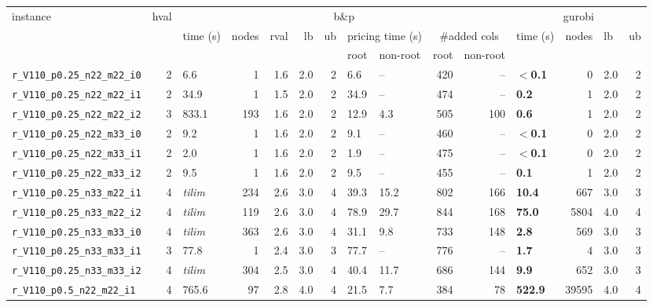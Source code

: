 \documentclass[preprint, 11pt, authoryear]{elsarticle}
\begin{document}
\begin{table}
\centering
\small
\setlength{\tabcolsep}{4pt}
\begin{tabular}{lrlrrrrllrrlrlr}
\toprule
instance & hval & \multicolumn{9}{c}{b\&p} & \multicolumn{4}{c}{gurobi} \\
\cmidrule(lr){3-11} \cmidrule(lr){12-15}
 &  & time (s) & nodes & rval & lb & ub & \multicolumn{2}{c}{pricing time (s)} & \multicolumn{2}{c}{\#added cols} & time (s) & nodes & lb & ub \\
\cmidrule(lr){8-9}\cmidrule(lr){10-11}
 &  &  &  &  &  &  & root & non-root & root & non-root &  &  &  &  \\
\midrule
\texttt{r\_V110\_p0.25\_n22\_m22\_i0} & 2 & 6.6 & 1 & 1.6 & 2.0 & 2 & 6.6 & -- & 420 & -- & $<$\textbf{0.1} & 0 & 2.0 & 2 \\
\texttt{r\_V110\_p0.25\_n22\_m22\_i1} & 2 & 34.9 & 1 & 1.5 & 2.0 & 2 & 34.9 & -- & 474 & -- & \textbf{0.2} & 1 & 2.0 & 2 \\
\texttt{r\_V110\_p0.25\_n22\_m22\_i2} & 3 & 833.1 & 193 & 1.6 & 2.0 & 2 & 12.9 & 4.3 & 505 & 100 & \textbf{0.6} & 1 & 2.0 & 2 \\
\texttt{r\_V110\_p0.25\_n22\_m33\_i0} & 2 & 9.2 & 1 & 1.6 & 2.0 & 2 & 9.1 & -- & 460 & -- & $<$\textbf{0.1} & 0 & 2.0 & 2 \\
\texttt{r\_V110\_p0.25\_n22\_m33\_i1} & 2 & 2.0 & 1 & 1.6 & 2.0 & 2 & 1.9 & -- & 475 & -- & $<$\textbf{0.1} & 0 & 2.0 & 2 \\
\texttt{r\_V110\_p0.25\_n22\_m33\_i2} & 2 & 9.5 & 1 & 1.6 & 2.0 & 2 & 9.5 & -- & 455 & -- & \textbf{0.1} & 1 & 2.0 & 2 \\
\texttt{r\_V110\_p0.25\_n33\_m22\_i1} & 4 & \textit{tilim} & 234 & 2.6 & 3.0 & 4 & 39.3 & 15.2 & 802 & 166 & \textbf{10.4} & 667 & 3.0 & 3 \\
\texttt{r\_V110\_p0.25\_n33\_m22\_i2} & 4 & \textit{tilim} & 119 & 2.6 & 3.0 & 4 & 78.9 & 29.7 & 844 & 168 & \textbf{75.0} & 5804 & 4.0 & 4 \\
\texttt{r\_V110\_p0.25\_n33\_m33\_i0} & 4 & \textit{tilim} & 363 & 2.6 & 3.0 & 4 & 31.1 & 9.8 & 733 & 148 & \textbf{2.8} & 569 & 3.0 & 3 \\
\texttt{r\_V110\_p0.25\_n33\_m33\_i1} & 3 & 77.8 & 1 & 2.4 & 3.0 & 3 & 77.7 & -- & 776 & -- & \textbf{1.7} & 4 & 3.0 & 3 \\
\texttt{r\_V110\_p0.25\_n33\_m33\_i2} & 4 & \textit{tilim} & 304 & 2.5 & 3.0 & 4 & 40.4 & 11.7 & 686 & 144 & \textbf{9.9} & 652 & 3.0 & 3 \\
\midrule
\texttt{r\_V110\_p0.5\_n22\_m22\_i1} & 4 & 765.6 & 97 & 2.8 & 4.0 & 4 & 21.5 & 7.7 & 384 & 78 & \textbf{522.9} & 39595 & 4.0 & 4 \\

\end{tabular}
\end{table}
\end{document}
